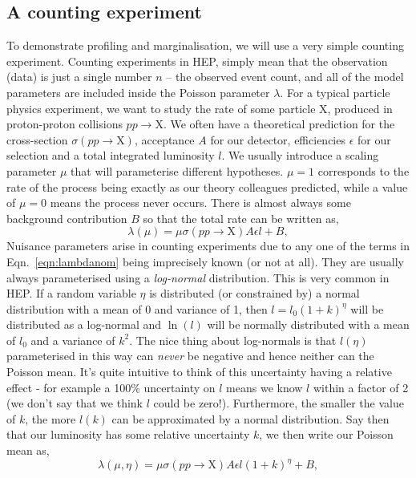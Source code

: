 \subsection{A counting experiment}
To demonstrate profiling and marginalisation, we will use a very simple counting experiment. Counting experiments in HEP, simply mean that the observation (data) is just a single number $n$ -- the observed event count, and all of the model parameters are included inside the Poisson parameter $\lambda$. For a typical particle physics experiment, we want to study the rate of some particle X, produced in proton-proton collisions $pp\rightarrow\mathrm{X}$. We often have a theoretical prediction for the cross-section $\sigma(pp\rightarrow \mathrm{X})$, acceptance $A$ for our detector, efficiencies $\epsilon$ for our selection and a total integrated luminosity $l$. We usually introduce a scaling parameter $\mu$ that will parameterise different hypotheses. $\mu=1$ corresponds to the rate of the process being exactly as our theory colleagues predicted, while a value of $\mu=0$ means the process never occurs. There is almost always some background contribution $B$ so that the total rate can be written as,
\begin{equation}\label{eqn:lambdanom}
    \lambda(\mu) = \mu\sigma(pp\rightarrow \mathrm{X}) A\epsilon l + B,
\end{equation}
Nuisance parameters arise in counting experiments due to any one of the terms in Eqn.~\ref{eqn:lambdanom} being imprecisely known (or not at all). They are usually always parameterised using a \emph{log-normal} distribution. This is very common in HEP. If a random variable $\eta$ is distributed (or constrained by) a normal distribution with a mean of 0 and variance of 1, then $l=l_{0}(1+k)^{\eta}$ will be distributed as a log-normal and $\ln(l)$ will be normally distributed with a mean of $l_{0}$ and a variance of $k^{2}$. The nice thing about log-normals is that $l(\eta)$ parameterised in this way can \emph{never} be negative and hence neither can the Poisson mean. It's quite intuitive to think of this uncertainty having a relative effect - for example a 100\% uncertainty on $l$ means we know $l$ within a factor of 2 (we don't say that we think $l$ could be zero!). Furthermore, the smaller the value of $k$, the more $l(k)$ can be approximated by a normal distribution. Say then that our luminosity has some relative uncertainty $k$, we then write our Poisson mean as,
\begin{equation}
    \lambda(\mu,\eta) = \mu\sigma(pp\rightarrow \mathrm{X}) A\epsilon l(1+k)^{\eta} + B,
\end{equation}

